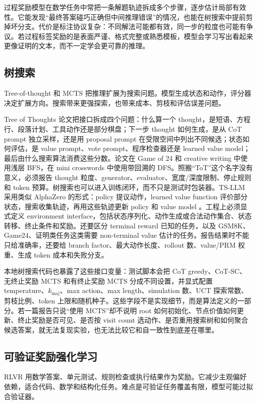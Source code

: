 \documentclass[UTF8,zihao=-4,openany]{ctexbook}
\begin{document}
过程奖励模型在数学任务中常把一条解题轨迹拆成多个步骤，逐步估计局部有效性。它能发现“最终答案碰巧正确但中间推理错误”的情况，也能在树搜索中提前剪掉坏分支。代价是标注协议复杂：不同解法可能都有效，同一步的粒度也可能有争议。若过程标签奖励的是表面严谨、格式完整或熟悉模板，模型会学习写出看起来更像证明的文本，而不一定学会更可靠的推理。

\subsection{树搜索}
Tree-of-thought 和 MCTS 把推理扩展为搜索问题。模型生成状态和动作，评分器决定扩展方向。搜索带来更强探索，也带来成本、剪枝和评估误差问题。

Tree of Thoughts 论文把接口拆成四个问题：什么算一个 thought，是短语、方程行、段落计划、工具动作还是部分棋盘；下一步 thought 如何生成，是从 CoT prompt 独立采样，还是用 proposal prompt 在受限空间中列出不同候选；状态如何评估，是 value prompt、vote prompt、程序检查器还是 learned value model；最后由什么搜索算法消费这些分数。论文在 Game of 24 和 creative writing 中使用浅层 BFS，在 mini crosswords 中使用带回溯的 DFS。照搬“ToT”这个名字没有意义，必须报告 thought 粒度、generator、evaluator、宽度/深度限制、停止规则和 token 预算。树搜索也可以进入训练闭环，而不只是测试时包装器。TS-LLM 采用类似 AlphaZero 的形式：policy 提议动作，learned value function 评价部分状态，搜索收集轨迹，再用这些轨迹更新 policy 和 value model \cite{wan2024alphazero}。工程上必须显式定义 environment interface，包括状态序列化、动作生成或合法动作集合、状态转移、终止条件和奖励。还要区分 terminal reward 已知的任务，以及 GSM8K、Game24、证明类任务这类需要 non-terminal value 估计的任务。报告结果时不能只给准确率，还要给 branch factor、最大动作长度、rollout 数、value/PRM 权重、生成 token 成本和失败分支。

本地树搜索代码也暴露了这些接口变量：测试脚本会把 CoT greedy、CoT-SC、无终止奖励 MCTS 和有终止奖励 MCTS 分成不同设置，并显式配置 temperature、$k_{\mathrm{maj}}$、max action、max length、simulation 数、UCT 探索常数、剪枝比例、token 上限和随机种子。这些字段不是实现细节，而是算法定义的一部分。若一篇报告只说“使用 MCTS”却不说明 root 如何初始化、节点价值如何更新、终止奖励是否可见、是否按 visit count 选动作、是否重用搜索树和如何聚合候选答案，就无法复现实验，也无法比较它和自一致性到底差在哪里。

\subsection{可验证奖励强化学习}
RLVR 用数学答案、单元测试、规则检查或执行结果作为奖励。它减少主观偏好依赖，适合代码、数学和结构化任务。难点是可验证任务覆盖有限，模型可能过拟合验证器。
\end{document}
